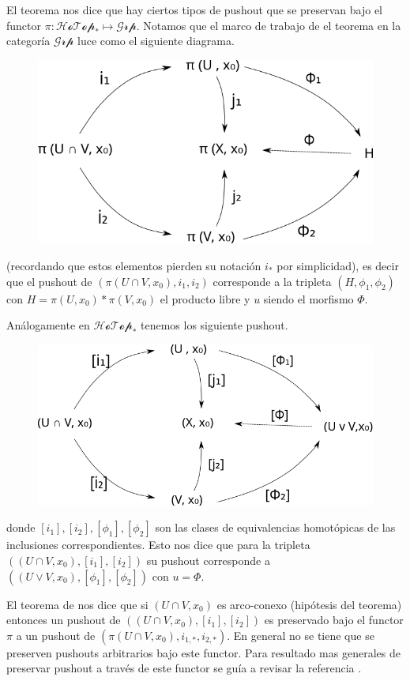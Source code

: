 El teorema \vank nos dice que hay ciertos tipos de pushout que se
preservan bajo el functor \(\pi : \mathscr{HoTop_*} \mapsto
\mathscr{Grp}\). Notamos que el marco de trabajo de el teorema en la
categoría \(\mathscr{Grp}\) luce como el siguiente diagrama.
\begin{figure}[H]
  \centering \includegraphics[scale=0.5]{./imagenes/van.png}
\end{figure}
(recordando que estos elementos pierden su notación \(i_*\) por
simplicidad), es decir que el pushout de \(\left( \pi (U \cap V , x_0) ,
i_1 , i_2 \right)\) corresponde a la tripleta \( \left( H , \phi_1 ,
\phi_2 \right)\) con \(H = \pi (U, x_0) * \pi (V , x_0)\) el producto
libre y \(u\) siendo el morfismo \(\Phi\).

Análogamente en \(\mathscr{HoTop}_*\) tenemos los siguiente pushout.
\begin{figure}[h]
  \centering \includegraphics[scale=0.5]{./imagenes/pushoutHotop.png}
\end{figure}
donde \([i_1],[i_2],[\phi_1],[\phi_2]\) son las clases de equivalencias
homotópicas de las inclusiones correspondientes. Esto nos dice que para
la tripleta \(\left( (U \cap V , x_0), [i_1] , [i_2]\right)\) su pushout
corresponde a \(\left( (U \vee V, x_0), [\phi_1], [\phi_2] \right)\) con
\(u = \Phi\).

El teorema de \vank nos dice que si \(\left( U \cap V , x_0 \right)\) es
arco-conexo (hipótesis del teorema) entonces un pushout de \( \left( (U
  \cap V , x_0) , [i_1] , [i_2] \right)\) es preservado bajo el functor
\(\pi\) a un pushout de \(\left( \pi (U \cap V , x_0) , i_{1,*}, i_{2,*}
\right)\). En general no se tiene que se preserven pushouts arbitrarios
bajo este functor. Para resultado mas generales de preservar pushout a
través de este functor se guía a revisar la referencia \cite{brown}.
